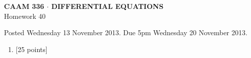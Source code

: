 \documentclass[10pt]{article}
\begin{document}
\vspace*{-5em}
\begin{center}
\large \textsf{\textbf{CAAM 336 $\cdot$ DIFFERENTIAL EQUATIONS}\\[0.5em]
Homework 40 }
\end{center}

Posted Wednesday 13 November 2013.  Due 5pm Wednesday 20 November 2013.

\begin{enumerate}\addtocounter{enumi}{39}
\item {[25 points]}  
\end{enumerate}
\end{document}
